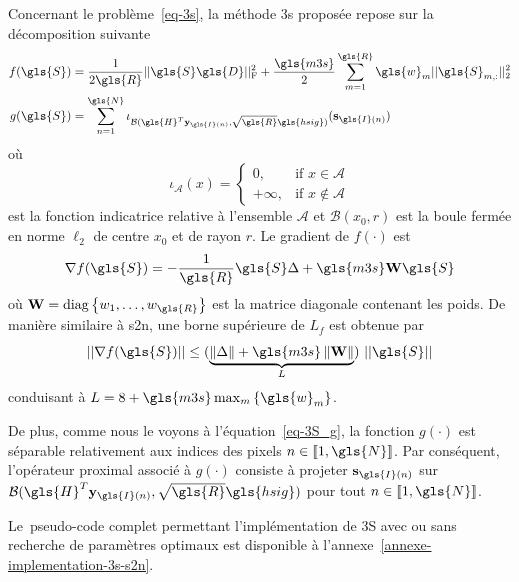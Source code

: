 Concernant le problème~\eqref{eq-3s}, la méthode \gls{3s} proposée repose sur la décomposition suivante
\begin{align}
    f(\gls{S}) &= 
    \frac{1}{2\gls{R}}\frobnorm{\gls{S} \gls{D}} + 
    \frac{\gls{m3s}}{2}\sum_{m=1}^{\gls{R}} \gls{w}_{m} \twonorm{\gls{S}_{m,:}}\\
    g(\gls{S}) &= 
    \sum_{n=1}^{\gls{N}} \iota_{
        \mathcal{B}(\gls{H}^T\mathbf{y}_{\gls{I}(n)},\sqrt{\gls{R}}\gls{hsig})
    }(\mathbf{s}_{\gls{I}(n)})
    \label{eq-3S_g}
\end{align}
où
\begin{equation}
    \iota_\mathcal{A}(x) = \left\{\begin{array}{lr}
    0,        & \text{if } x\in   \mathcal{A}\\
    +\infty, & \text{if } x\notin\mathcal{A}
    \end{array}\right.
\end{equation}
est la fonction indicatrice relative à l'ensemble $\mathcal{A}$ et $\mathcal{B}(x_0,r)$ est la boule fermée en norme $\ell_2$ de centre $x_0$ et de rayon $r$.
Le gradient de $f(\cdot)$ est
\begin{equation}\label{nabla-f-3s}
    \nabla f(\gls{S}) = -\frac{1}{\gls{R}} \gls{S}\Delta + \gls{m3s}\mathbf{W}\gls{S}\\
\end{equation}
où $\mathbf{W}=\mathrm{diag}\left\{w_1,\ldots,w_{\gls{R}}\right\}$ est la matrice diagonale contenant les poids.
De manière similaire à \gls{s2n}, une borne supérieure de $L_f$ est obtenue par
\begin{equation}
||\nabla f(\gls{S})|| \leq 
(\underbrace{\left\|\Delta\right\| + \gls{m3s}\left\|\mathbf{W}\right\|}_{L})
\ ||\gls{S}||
\end{equation}
conduisant à $L = 8+\gls{m3s}\max_{m}\left\{\gls{w}_{m}\right\}$.

De plus, comme nous le voyons à l'équation~\eqref{eq-3S_g}, la fonction $g(\cdot)$ est séparable relativement aux indices des pixels $n \in \llbracket 1,\gls{N}\rrbracket$. Par conséquent, l'opérateur proximal associé à $g(\cdot)$ consiste à projeter $\mathbf{s}_{\gls{I}(n)}$ sur $\mathcal{B}(\gls{H}^T\mathbf{y}_{\gls{I}(n)},\sqrt{\gls{R}}\gls{hsig})$ pour tout $n\in \llbracket 1,\gls{N}\rrbracket$.

Le pseudo-code complet permettant l'implémentation de 3S avec ou sans recherche de paramètres optimaux est disponible à l'annexe~\ref{annexe-implementation-3s-s2n}.

